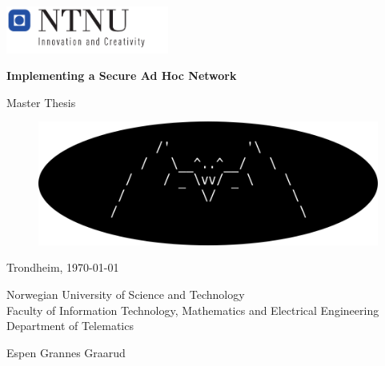 \begin{titlepage}
 
	\parindent=0cm
	\addtolength{\parskip}{\baselineskip}

	\includegraphics[width=0.4\textwidth]{images/logo_ntnu.pdf}
	\vspace{2cm}\vspace{0.5cm}
	
	{\Huge \textbf{Implementing a Secure Ad Hoc Network}}

	{\LARGE Master Thesis}
	
		\vspace{1.5cm}	
		\begin{figure}[ht!]
		\centering
		\includegraphics[width=15cm]{images/1000px_official_batman_logo.png}

	\end{figure}
	\vfill
	
	{\normalsize Trondheim, \today
	
	Norwegian University of Science and Technology\\
	Faculty of Information Technology, Mathematics and Electrical Engineering \\
	Department of Telematics}
	\vspace{2cm}\vspace{0.75cm}

	{\large Espen Grannes Graarud}

\end{titlepage}
